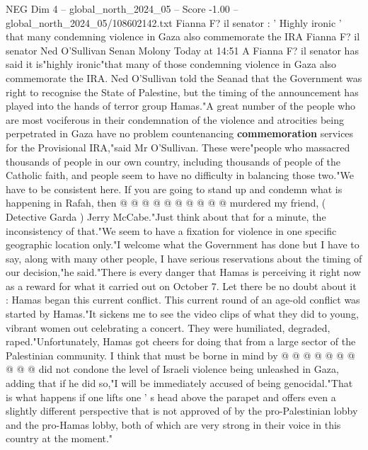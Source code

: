 \begin{textsample}{NEG Dim 4 – global\_north\_2024\_05 – Score -1.00 – global\_north\_2024\_05/108602142.txt}  \label{ex:f4_neg_111}
Fianna F? il senator : ' Highly ironic ' that many condemning violence in Gaza also commemorate the IRA Fianna F? il senator Ned O'Sullivan Senan Molony Today at 14:51 A Fianna F? il senator has said it is"highly ironic"that many of those condemning violence in Gaza also commemorate the IRA.
Ned O'Sullivan told the Seanad that the Government was right to recognise the State of Palestine, but the timing of the announcement has played into the hands of terror group Hamas."A great number of the people who are most vociferous in their condemnation of the violence and atrocities being perpetrated in Gaza have no problem countenancing \textbf{commemoration} services for the Provisional IRA,"said Mr O'Sullivan.
These were"people who massacred thousands of people in our own country, including thousands of people of the Catholic faith, and people seem to have no difficulty in balancing those two."We have to be consistent here.
If you are going to stand up and condemn what is happening in Rafah, then @ @ @ @ @ @ @ @ @ @ murdered my friend, ( Detective Garda ) Jerry McCabe."Just think about that for a minute, the inconsistency of that."We seem to have a fixation for violence in one specific geographic location only."I welcome what the Government has done but I have to say, along with many other people, I have serious reservations about the timing of our decision,"he said."There is every danger that Hamas is perceiving it right now as a reward for what it carried out on October 7.
Let there be no doubt about it : Hamas began this current conflict.
This current round of an age-old conflict was started by Hamas."It sickens me to see the video clips of what they did to young, vibrant women out celebrating a concert.
They were humiliated, degraded, raped."Unfortunately, Hamas got cheers for doing that from a large sector of the Palestinian community.
I think that must be borne in mind by @ @ @ @ @ @ @ @ @ @ did not condone the level of Israeli violence being unleashed in Gaza, adding that if he did so,"I will be immediately accused of being genocidal."That is what happens if one lifts one ' s head above the parapet and offers even a slightly different perspective that is not approved of by the pro-Palestinian lobby and the pro-Hamas lobby, both of which are very strong in their voice in this country at the moment."

\end{textsample}
